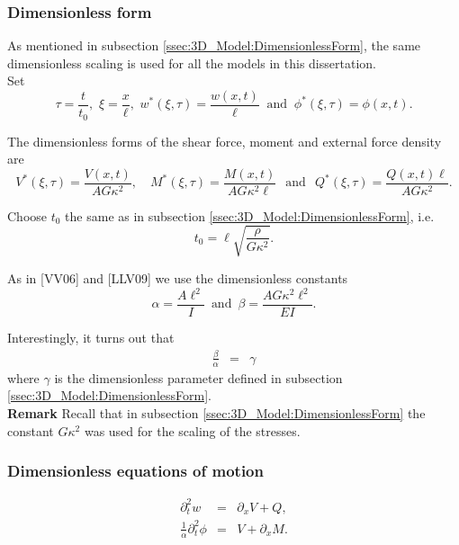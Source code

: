 \documentclass[../../main.tex]{subfiles}
\begin{document}
    \subsubsection*{Dimensionless form}\label{sssec:1D_Model:DimensionlessForm}
    As mentioned in subsection \ref{ssec:3D_Model:DimensionlessForm}, the same dimensionless scaling is used for all the models in this dissertation.\\

    Set \[\tau = \frac{t}{t_0}, \,\, \xi = \frac{x}{\ell}, \,\, w^*(\xi,\tau) = \frac{w(x,t)}{\ell} \ \text{ and } \ \phi^*(\xi, \tau) = \phi(x,t).\]

    The dimensionless forms of the shear force, moment and external force density are \[ V^{*}(\xi,\tau) = \frac{V(x,t)}{AG\kappa^2}, \quad M^{*}(\xi,\tau) = \frac{M(x,t)}{A G\kappa^2 \ell} \,\,\, \ \text{and} \ \,\,\, Q^*(\xi,\tau) = \frac{Q(x,t)\ell}{A G\kappa^2}.\]

    Choose $t_0$ the same as in subsection \ref{ssec:3D_Model:DimensionlessForm}, i.e. \[t_0 = \ell\sqrt{\frac{\rho}{G\kappa^2}}.\]

    As in [VV06] and [LLV09] we use the dimensionless constants
    \begin{equation*}
        \alpha = \frac{A \ell^2}{I} \,\,\, \text{and} \,\,\, \beta
        =\frac{AG\kappa^2 \ell^2}{EI}.
    \end{equation*}\label{sym:alphabeta}

    Interestingly, it turns out that
    \begin{eqnarray*}
        \frac{\beta}{\alpha} & = & \gamma
    \end{eqnarray*} where $\gamma$ is the dimensionless parameter defined in subsection \ref{ssec:3D_Model:DimensionlessForm}.\\

    \textbf{Remark} Recall that in subsection \ref{ssec:3D_Model:DimensionlessForm} the constant $G\kappa^2$ was used for the scaling of the stresses.

    \subsubsection*{Dimensionless equations of motion}\label{sssec:1D_Model:DimensionlessEquationsOfMotion}
    \begin{eqnarray}
        \partial_{t}^{2} w &=& \partial_{x}V + Q, \label{eq:1D_Model:EquationOfMotion1D}\\
        \frac{1}{\alpha} \partial_{t}^{2} \phi &=& V + \partial_{x}M.\label{eq:1D_Model:EquationOfMotion2D}
    \end{eqnarray}
\end{document}
